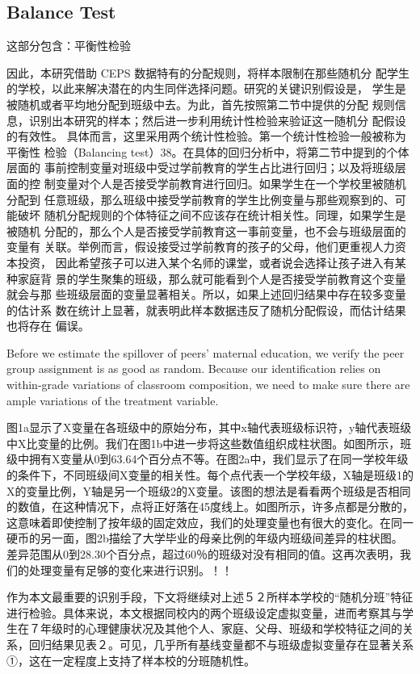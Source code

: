 \subsection{Balance Test}

这部分包含：平衡性检验

因此，本研究借助 CEPS 数据特有的分配规则，将样本限制在那些随机分 配学生的学校，以此来解决潜在的内生同伴选择问题。研究的关键识别假设是， 学生是被随机或者平均地分配到班级中去。为此，首先按照第二节中提供的分配 规则信息，识别出本研究的样本；然后进一步利用统计性检验来验证这一随机分 配假设的有效性。 具体而言，这里采用两个统计性检验。第一个统计性检验一般被称为平衡性 检验（Balancing test）38。在具体的回归分析中，将第二节中提到的个体层面的 事前控制变量对班级中受过学前教育的学生占比进行回归；以及将班级层面的控 制变量对个人是否接受学前教育进行回归。如果学生在一个学校里被随机分配到 任意班级，那么班级中接受学前教育的学生比例变量与那些观察到的、可能破坏 随机分配规则的个体特征之间不应该存在统计相关性。同理，如果学生是被随机 分配的，那么个人是否接受学前教育这一事前变量，也不会与班级层面的变量有 关联。举例而言，假设接受过学前教育的孩子的父母，他们更重视人力资本投资， 因此希望孩子可以进入某个名师的课堂，或者说会选择让孩子进入有某种家庭背 景的学生聚集的班级，那么就可能看到个人是否接受学前教育这个变量就会与那 些班级层面的变量显著相关。所以，如果上述回归结果中存在较多变量的估计系 数在统计上显著，就表明此样本数据违反了随机分配假设，而估计结果也将存在 偏误。

Before we estimate the spillover of peers’ maternal education, we verify the peer group assignment is as good as random. Because our identification relies on within-grade variations of classroom composition, we need to make sure there are ample variations of the treatment variable.

图1a显示了X变量在各班级中的原始分布，其中x轴代表班级标识符，y轴代表班级中X比变量的比例。我们在图1b中进一步将这些数值组织成柱状图。如图所示，班级中拥有X变量从0到63.64个百分点不等。在图2a中，我们显示了在同一学校年级的条件下，不同班级间X变量的相关性。每个点代表一个学校年级，X轴是班级1的X的变量比例，Y轴是另一个班级2的X变量。该图的想法是看看两个班级是否相同的数值，在这种情况下，点将正好落在45度线上。如图所示，许多点都是分散的，这意味着即使控制了按年级的固定效应，我们的处理变量也有很大的变化。在同一硬币的另一面，图2b描绘了大学毕业的母亲比例的年级内班级间差异的柱状图。差异范围从0到28.30个百分点，超过60％的班级对没有相同的值。这再次表明，我们的处理变量有足够的变化来进行识别。！！

作为本文最重要的识别手段，下文将继续对上述５２所样本学校的“随机分班”特征进行检验。具体来说，本文根据同校内的两个班级设定虚拟变量，进而考察其与学生在７年级时的心理健康状况及其他个人、家庭、父母、班级和学校特征之间的关系，回归结果见表２。可见，几乎所有基线变量都不与班级虚拟变量存在显著关系①，这在一定程度上支持了样本校的分班随机性。


